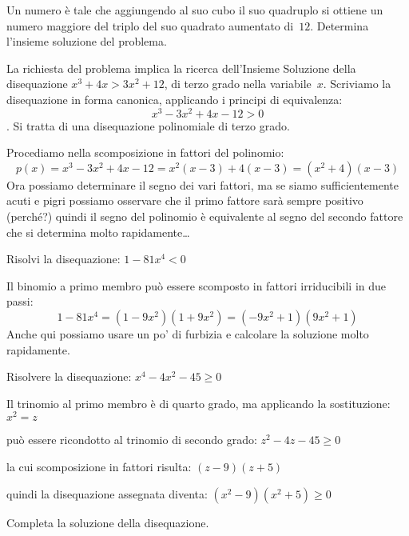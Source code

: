 \begin{esempio}
Un numero è tale che aggiungendo al suo cubo il suo quadruplo si ottiene 
un numero maggiore del triplo del suo quadrato aumentato di~\(12\). Determina 
l'insieme soluzione del problema.

La richiesta del problema implica la ricerca dell'Insieme Soluzione della 
disequazione \(x^3+4x>3x^2+12\), di terzo grado nella variabile~\(x\). 
Scriviamo la disequazione in forma canonica, applicando i principi di 
equivalenza: 
\[x^3-3x^2+4x-12>0\]. 
Si tratta di una disequazione polinomiale di terzo grado.

Procediamo nella scomposizione in fattori del polinomio:
\[p(x)=x^3-3x^2+4x-12 = x^2 \left(x-3\right)+4 \left(x-3\right) =
      \left(x^2+4\right) \left(x-3\right)\]
Ora possiamo determinare il segno dei vari fattori, ma se siamo 
sufficientemente acuti e pigri possiamo osservare che il primo fattore sarà 
sempre positivo (perché?) quindi il segno del polinomio è equivalente al 
segno del secondo fattore che si determina molto rapidamente\dots
\end{esempio}

\begin{esempio}
Risolvi la disequazione: \(1-81x^4<0\)

Il binomio a primo membro può essere scomposto in fattori irriducibili in due 
passi:
\[1-81x^4 = \left(1-9x^2\right)\left(1+9x^2\right)=
  \left(-9x^2+1\right)\left(9x^2+1\right)\]
Anche qui possiamo usare un po' di furbizia e calcolare la soluzione molto 
rapidamente.
\end{esempio}

\begin{esempio}
Risolvere la disequazione: \(x^4-4x^2-45 \ge 0\)

Il trinomio al primo membro è di quarto grado, ma applicando la 
sostituzione: 
\(x^2=z\)

può essere ricondotto al trinomio di secondo grado:
\(z^2-4z-45 \ge 0\)

la cui scomposizione in fattori risulta:
\(\left(z-9\right)\left(z+5\right)\)

quindi la disequazione assegnata diventa: 
\((x^2-9)(x^2+5) \ge 0\)

Completa la soluzione della disequazione.
\end{esempio}

% 

